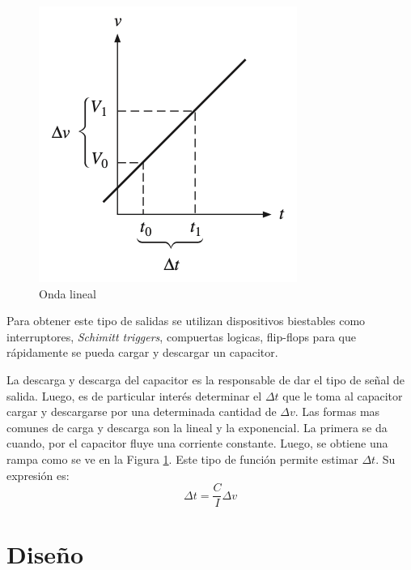 \documentclass[12pt,a4paper]{article}
\begin{document}
    \begin{figure}
        \includegraphics[width=0.9\linewidth]{Resources/lineal_waveform.png}
        \caption{Onda lineal}
        \label{fig:ej3_lineal_waveform}
        \end{figure}
    
    Para obtener este tipo de salidas se utilizan dispositivos biestables como interruptores, \textit{Schimitt triggers}, compuertas logicas, flip-flops para que rápidamente se pueda cargar y descargar un capacitor.
    

    La descarga y descarga del capacitor es la responsable de dar el tipo de señal de salida. Luego, es de particular interés determinar el $\Delta t$ que le toma al capacitor cargar y descargarse por una determinada cantidad de $\Delta v$. Las formas mas comunes de carga y descarga son la lineal y la exponencial. La primera se da cuando, por el capacitor fluye una corriente constante. Luego, se obtiene una rampa como se ve en la Figura \ref{fig:ej3_lineal_waveform}. Este tipo de función permite estimar  $\Delta t$. Su expresión es:
	\begin{equation}
        \Delta t = \frac{C}{I} \Delta v
        \label{eq:delta_t}
    \end{equation} 

\section{Diseño}
\end{document}
